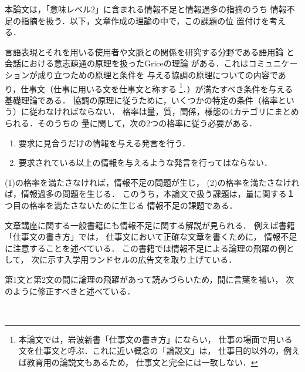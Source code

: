 \documentclass[japanese]{jnlp_1.3e}
\begin{document}
本論文は，「意味レベル2」に含まれる情報不足と情報過多の指摘のうち
情報不足の指摘を扱う．以下，文章作成の理論の中で，この課題の位
置付けを考える．

言語表現とそれを用いる使用者や文脈との関係を研究する分野である語用論
\cite{Green}と会話における意志疎通の原理を扱ったGriceの理論\cite{Grice}
がある．これはコミュニケーションが成り立つための原理と条件を
与える協調の原理についての内容であり，仕事文（仕事に用いる文を仕事文と称する
\footnote{本論文では，岩波新書「仕事文の書き方」\cite{高橋昭男}にならい，
仕事の場面で用いる文を仕事文と呼ぶ．これに近い概念の「論説文」は，
仕事目的以外の，例えば教育用の論説文もあるため，
仕事文と完全には一致しない．}．）が満たすべき条件を与える基礎理論である．
協調の原理に従うために，いくつかの特定の条件（格率という）に従わなければならない．
格率は量，質，関係，様態の4カテゴリにまとめられる．そのうちの
量に関して，次の2つの格率に従う必要がある．
\begin{enumerate}
 \item 要求に見合うだけの情報を与える発言を行う．
 \item 要求されている以上の情報を与えるような発言を行ってはならない．
\end{enumerate}
(1)の格率を満たさなければ，情報不足の問題が生じ，
(2)の格率を満たさなければ，情報過多の問題を生じる．
このうち，本論文で扱う課題は，量に関する１つ目の格率を満たさないために生じる
情報不足の課題である．

文章講座に関する一般書籍にも情報不足に関する解説が見られる．
例えば書籍「仕事文の書き方」\cite{高橋昭男}では，
仕事文において正確な文章を書くために，
情報不足に注意することを述べている．
この書籍では情報不足による論理の飛躍の例として，
次に示す入学用ランドセルの広告文を取り上げている．

    \vspace{10.5pt}\begin{center}
    \end{center}\vspace{10.5pt}

\noindent
第1文と第2文の間に論理の飛躍があって読みづらいため，間に言葉を補い，
次のように修正すべきと述べている．
    \vspace{10.5pt}\begin{center}
    \\
    \end{center}\vspace{10.5pt}
\end{document}
